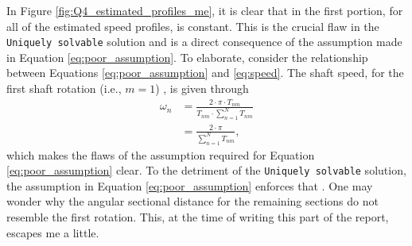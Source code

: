 \documentclass{article}
\begin{document}
	In Figure \ref{fig:Q4_estimated_profiles_me}, it is clear that in the first portion, for all of the estimated speed profiles, is constant. This is the crucial flaw in the \texttt{Uniquely solvable} solution and is a direct consequence of the assumption made in Equation \eqref{eq:poor_assumption}. To elaborate, consider the relationship between Equations \eqref{eq:poor_assumption}  and \eqref{eq:speed}. The shaft speed, for the first shaft rotation (i.e., $m=1$) , is given through
	\begin{equation}
		\begin{aligned}
			\omega_n &= \frac{2\cdot\pi \cdot T_{nm}}{T_{nm}\cdot \sum_{n=1}^{N}T_{nm}} \\
			&= \frac{2\cdot\pi}{\sum_{n=1}^{N}T_{nm}},
		\end{aligned}
	\end{equation}
	which makes the flaws of the assumption required for Equation \eqref{eq:poor_assumption} clear. To the detriment of the \texttt{Uniquely solvable} solution, the assumption in Equation \eqref{eq:poor_assumption} enforces that . One may wonder why the angular sectional distance for the remaining sections do not resemble the first rotation. This, at the time of writing this part of the report, escapes me a little. 
\end{document}
